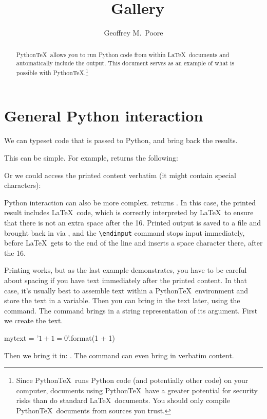 \documentclass[11pt]{article}
\title{\pytex\ Gallery}
\author{Geoffrey M.\ Poore}
\newcommand{\pytex}{Python\TeX}
\begin{document}
\maketitle


\begin{abstract}
\pytex\ allows you to run Python code from within \LaTeX\ documents and automatically include the output.  This document serves as an example of what is possible with \pytex.\footnote{Since \pytex\ runs Python code (and potentially other code) on your computer, documents using \pytex\ have a greater potential for security risks than do standard \LaTeX\ documents.  You should only compile \pytex\ documents from sources you trust.}
\end{abstract}



\section{General Python interaction}

We can typeset code that is passed to Python, and bring back the results.

This can be simple.  For example,  returns the following:
\begin{quote}
\printpythontex
\end{quote}

Or we could access the printed content verbatim (it might contain special characters):
\begin{quote}
\printpythontex[verb]
\end{quote}

Python interaction can also be more complex.   returns \printpythontex.  In this case, the printed result includes \LaTeX\ code, which is correctly interpreted by \LaTeX\ to ensure that there is not an extra space after the 16.  Printed output is saved to a file and brought back in via \verb||, and the \verb|\endinput| command stops input immediately, before \LaTeX\ gets to the end of the line and inserts a space character there, after the 16.

Printing works, but as the last example demonstrates, you have to be careful about spacing if you have text immediately after the printed content.  In that case, it's usually best to assemble text within a \pytex\ environment and store the text in a variable.  Then you can bring in the text later, using the  command.  The  command brings in a string representation of its argument.  First we create the text.
\begin{pyblock}
mytext = '$1 + 1 = {0}$'.format(1 + 1)
\end{pyblock}
Then we bring it in:  .  The  command can even bring in verbatim content.
\end{document}
